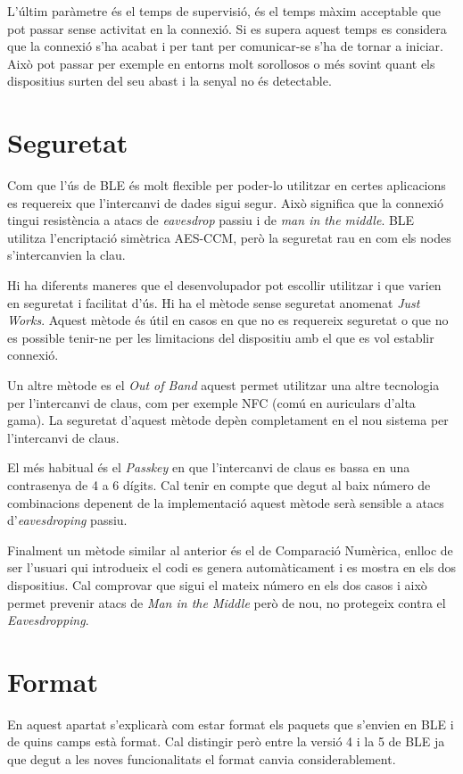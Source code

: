 L'últim paràmetre és el temps de supervisió, és el temps màxim acceptable que pot passar sense activitat en la connexió.
Si es supera aquest temps es considera que la connexió s'ha acabat i per tant per comunicar-se s'ha de tornar a iniciar.
Això pot passar per exemple en entorns molt sorollosos o més sovint quant els dispositius surten del seu abast i la senyal no és detectable.

\section{Seguretat}
\label{sec:security}
Com que l'ús de BLE és molt flexible per poder-lo utilitzar en certes aplicacions es requereix que l'intercanvi de dades sigui segur.
Això significa que la connexió tingui resistència a atacs de \textit{eavesdrop} passiu i de \textit{man in the middle}.
BLE utilitza l'encriptació simètrica AES-CCM, però la seguretat rau en com els nodes s'intercanvien la clau.

Hi ha diferents maneres que el desenvolupador pot escollir utilitzar i que varien en seguretat i facilitat d'ús.
Hi ha el mètode sense seguretat anomenat \textit{Just Works}.
Aquest mètode és útil en casos en que no es requereix seguretat o que no es possible tenir-ne per les limitacions del dispositiu amb el que es vol establir connexió.

Un altre mètode es el \textit{Out of Band} aquest permet utilitzar una altre tecnologia per l'intercanvi de claus, com per exemple NFC (comú en auriculars d'alta gama).
La seguretat d'aquest mètode depèn completament en el nou sistema per l'intercanvi de claus.

El més habitual és el \textit{Passkey} en que l'intercanvi de claus es bassa en una contrasenya de 4 a 6 dígits.
Cal tenir en compte que degut al baix número de combinacions depenent de la implementació aquest mètode serà sensible a atacs d'\textit{eavesdroping} passiu.

Finalment un mètode similar al anterior és el de Comparació Numèrica, enlloc de ser l'usuari qui introdueix el codi es genera automàticament i es mostra en els dos dispositius.
Cal comprovar que sigui el mateix número en els dos casos i això permet prevenir atacs de \textit{Man in the Middle} però de nou, no protegeix contra el \textit{Eavesdropping}.

\section{Format}
\label{sec:format}
En aquest apartat s'explicarà com estar format els paquets que s'envien en BLE i de quins camps està format.
Cal distingir però entre la versió 4 i la 5 de BLE ja que degut a les noves funcionalitats el format canvia considerablement.

